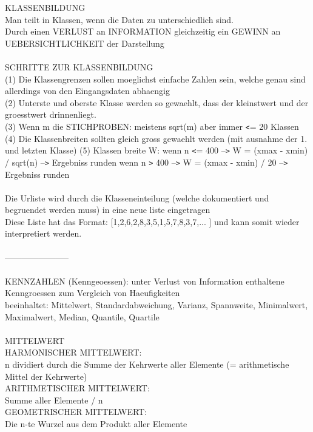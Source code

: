 \documentclass[12pt]{article}
\begin{document}
KLASSENBILDUNG \\
   Man teilt in Klassen, wenn die Daten zu unterschiedlich sind. \\
   Durch einen VERLUST an INFORMATION gleichzeitig ein GEWINN an UEBERSICHTLICHKEIT der Darstellung
\\ \\
    SCHRITTE ZUR KLASSENBILDUNG \\
        (1) Die Klassengrenzen sollen moeglichst einfache Zahlen sein, welche genau sind allerdings von den Eingangsdaten abhaengig \\
        (2) Unterste und oberste Klasse werden so gewaehlt, dass der kleinstwert und der groesstwert drinnenliegt. \\
        (3) Wenn m die STICHPROBEN: meistens sqrt(m) aber immer \verb|<|= 20 Klassen \\
        (4) Die Klassenbreiten sollten gleich gross gewaehlt werden (mit ausnahme der 1. und letzten Klasse)
        (5) Klassen breite W:   wenn n \verb|<|= 400 --\verb|>| W = (xmax - xmin) / sqrt(n) --\verb|>| Ergebniss runden
                                wenn n \verb|>| 400 --\verb|>| W = (xmax - xmin) / 20 --\verb|>| Ergebniss runden
\\ \\
    Die Urliste wird durch die Klasseneinteilung (welche dokumentiert und begruendet werden muss) in eine neue liste eingetragen \\
    Diese Liste hat das Format: [1,2,6,2,8,3,5,1,5,7,8,3,7,... ] und kann somit wieder interpretiert werden.
\\ \\
-----------------------
\\ \\
KENNZAHLEN (Kenngeoessen): unter Verlust von Information enthaltene Kenngroessen zum Vergleich von Haeufigkeiten \\
    beeinhaltet: Mittelwert, Standardabweichung, Varianz, Spannweite, Minimalwert, Maximalwert, Median, Quantile, Quartile \\ \\

MITTELWERT \\
    HARMONISCHER MITTELWERT: \\
      n dividiert durch die Summe der Kehrwerte aller Elemente (= arithmetische Mittel der Kehrwerte) \\
    ARITHMETISCHER MITTELWERT: \\
      Summe aller Elemente / n \\
    GEOMETRISCHER MITTELWERT: \\
        Die n-te Wurzel aus dem Produkt aller Elemente \\ \\
\end{document}
